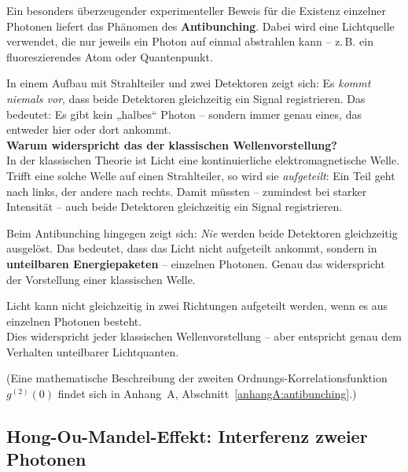Ein besonders überzeugender experimenteller Beweis für die Existenz einzelner Photonen liefert das Phänomen des \textbf{Antibunching}. Dabei wird eine Lichtquelle verwendet, die nur jeweils ein Photon auf einmal abstrahlen kann – z.\,B. ein fluoreszierendes Atom oder Quantenpunkt.

In einem Aufbau mit Strahlteiler und zwei Detektoren zeigt sich: Es \emph{kommt niemals vor}, dass beide Detektoren gleichzeitig ein Signal registrieren. Das bedeutet: Es gibt kein „halbes“ Photon – sondern immer genau eines, das entweder hier oder dort ankommt.\\
\textbf{Warum widerspricht das der klassischen Wellenvorstellung?} \\
In der klassischen Theorie ist Licht eine kontinuierliche elektromagnetische Welle. Trifft eine solche Welle auf einen Strahlteiler, so wird sie \emph{aufgeteilt}: Ein Teil geht nach links, der andere nach rechts. Damit müssten – zumindest bei starker Intensität – auch beide Detektoren gleichzeitig ein Signal registrieren.

Beim Antibunching hingegen zeigt sich: \emph{Nie} werden beide Detektoren gleichzeitig ausgelöst. Das bedeutet, dass das Licht nicht aufgeteilt ankommt, sondern in \textbf{unteilbaren Energiepaketen} – einzelnen Photonen. Genau das widerspricht der Vorstellung einer klassischen Welle.

\vspace{1em}
\begin{tcolorbox}[physikbox, title=Was Antibunching zeigt]
	\label{box:wasAntibunching}
	\small
	Licht kann nicht gleichzeitig in zwei Richtungen aufgeteilt werden, wenn es aus einzelnen Photonen besteht.\\
	Dies widerspricht jeder klassischen Wellenvorstellung – aber entspricht genau dem Verhalten unteilbarer Lichtquanten.
\end{tcolorbox}
\vspace{1em}
(Eine mathematische Beschreibung der zweiten Ordnungs-Korrelations\-funktion \( g^{(2)}(0) \) findet sich in Anhang~A, Abschnitt~\ref{anhangA:antibunching}.) %
\subsection{Hong-Ou-Mandel-Effekt: \newline Interferenz zweier Photonen}

